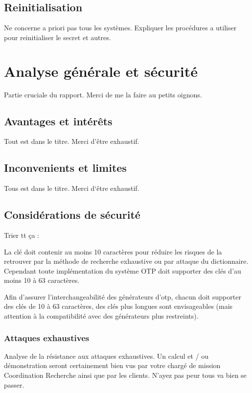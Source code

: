 \documentclass{../res/univ-projet}
\begin{document}
  \subsection{Reinitialisation}
    Ne concerne a priori pas tous les systèmes. Expliquer les procédures a 
utiliser pour reinitialiser le secret et autres.

\section{Analyse générale et sécurité}
  Partie cruciale du rapport. Merci de me la faire au petits oignons.

  \subsection{Avantages et intér\^ets}
    Tout est dans le titre. Merci d'\^etre exhaustif.
  
  \subsection{Inconvenients et limites}
    Tous est dans le titre. Merci d`\^etre exhaustif.
  
  \subsection{Considérations de sécurité}
    Trier tt ça :

    La clé doit contenir au moins 10 caractères pour réduire les risques de la 
retrouver par la méthode de recherche exhaustive ou par attaque du dictionnaire. 
Cependant toute implémentation du système OTP doit supporter des clés d'au moins 
10 à 63 caractères.

    Afin d'assurer l'interchangeabilité des générateurs d'otp, chacun doit 
supporter des clés de 10 à 63 caractères, des clés plus longues sont 
envisageables (mais attention à la compatibilité avec des générateurs plus 
restreints).

    \subsubsection{Attaques exhaustives}
      Analyse de la résistance aux attaques exhaustives. Un calcul et / ou 
démonstration seront certainement bien vus par votre chargé de mission 
      \og{}Coordination Recherche\fg{} ainsi que par les clients. N'ayez pas 
peur tous va bien se passer.
    
\end{document}
